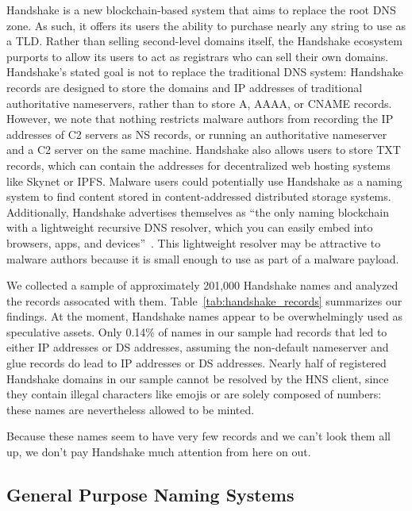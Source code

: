 Handshake is a new blockchain-based system that aims to 
replace the root DNS 
zone. As such, it offers its users the ability to purchase 
nearly any string to 
use as a TLD. Rather than selling second-level domains 
itself, the Handshake ecosystem purports to allow its users 
to act as registrars who can sell their own domains. 
Handshake's stated goal is not to replace the traditional DNS 
system: Handshake records are designed to store the domains 
and IP addresses of traditional authoritative nameservers, 
rather than to store A, AAAA, or CNAME records. However, we note that nothing 
restricts malware authors from recording the IP addresses of C2 servers as NS 
records, or running an authoritative nameserver and a C2 server on the same 
machine. Handshake also allows users to store TXT records, which can 
contain the addresses for decentralized web hosting systems 
like Skynet or IPFS. Malware users could potentially use 
Handshake as a naming system to find content stored in 
content-addressed distributed storage systems. Additionally, Handshake 
advertises themselves as ``the only naming blockchain with a lightweight 
recursive DNS resolver, which you can easily embed into 
browsers, apps, and devices''~\cite{namebase_access_handshake}. 
This lightweight resolver may be attractive to malware authors because it is 
small enough to use as part of a malware payload.


We collected a sample of approximately 201,000 Handshake names and analyzed the 
records assocated with them. Table~\ref{tab:handshake_records} 
summarizes our findings. At the moment, Handshake names appear to be 
overwhelmingly used as speculative assets. Only 0.14\% of names in our sample 
had records that led to either IP addresses or DS addresses, assuming the 
non-default nameserver and glue records do lead to IP addresses or DS 
addresses. Nearly half of registered Handshake domains in our sample cannot be 
resolved by the HNS client, since they contain illegal characters like emojis 
or are solely composed of numbers: these names are nevertheless allowed to be 
minted.

Because these names seem to have very few records and we can't look them all 
up, we don't pay Handshake much attention from here on out.

\subsection{General Purpose Naming Systems}

